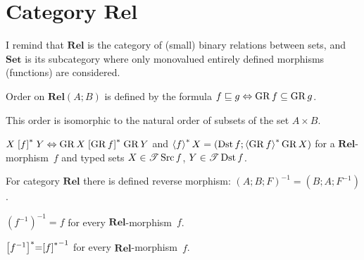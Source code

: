 \section{\texorpdfstring{Category $\mathbf{Rel}$}{Category Rel}}

I remind that $\mathbf{Rel}$ is the category of (small) binary relations
between sets, and $\mathbf{Set}$ is its subcategory where only monovalued
entirely defined morphisms (functions) are considered.
\begin{defn}
Order on $\mathbf{Rel}(A;B)$ is defined by the formula $f\sqsubseteq g\Leftrightarrow\operatorname{GR} f\subseteq\operatorname{GR} g$.\end{defn}
\begin{obvious}
This order is isomorphic to the natural order of subsets of the set
$A\times B$.\end{obvious}
\begin{defn}
$X\mathrel{\left[f\right]^{\ast}}Y\Leftrightarrow\operatorname{GR} X\mathrel{\left[\operatorname{GR} f\right]^{\ast}}\operatorname{GR} Y$ and $\left\langle f\right\rangle ^{\ast}X=(\operatorname{Dst} f;\left\langle \operatorname{GR} f\right\rangle ^{\ast}\operatorname{GR} X)$
for a $\mathbf{Rel}$-morphism~$f$ and typed sets $X\in\mathscr{T}\operatorname{Src} f$,
$Y\in\mathscr{T}\operatorname{Dst} f$.
\end{defn}

\begin{defn}
For category $\mathbf{Rel}$ there is defined reverse morphism: $(A;B;F)^{-1}=(B;A;F^{-1})$.\end{defn}
\begin{obvious}
$(f^{-1})^{-1}=f$ for every $\mathbf{Rel}$-morphism~$f$.
\end{obvious}

\begin{obvious}
$\mathrel{\left[f^{-1}\right]^{\ast}}=\mathrel{\left[f\right]^{\ast}}^{-1}$ for every $\mathbf{Rel}$-morphism~$f$.
\end{obvious}

